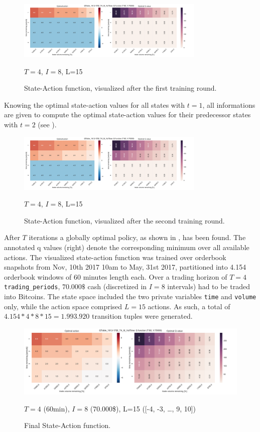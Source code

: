 \begin{figure}[ht]
	\centering
   \includegraphics[width=0.8\textwidth]{content/drawings/heatmap_3months_t1}
	\caption{State-Action function, visualized after the first training round.}
	$T=4$, $I=8$, L=15
	\label{fig:heatmap:t1}
\end{figure}

Knowing the optimal state-action values for all states with $t=1$, all informations are given to compute the optimal state-action values for their predecessor states with $t=2$ (see ).

\begin{figure}[ht]
	\centering
   \includegraphics[width=0.8\textwidth]{content/drawings/heatmap_3months_t2}
	\caption{State-Action function, visualized after the second training round.}
	$T=4$, $I=8$, L=15
	\label{fig:heatmap:t2}
\end{figure}

After $T$ iterations a globally optimal policy, as shown in , has been found. The annotated q values (right) denote the corresponding minimum over all available actions. The visualized state-action function was trained over orderbook snapshots from Nov, 10th 2017 10am to May, 31st 2017, partitioned into 4.154 orderbook windows of 60 minutes length each. Over a trading horizon of $T=4$ \lstinline!trading_periods!, $70.000\$$ cash (discretized in $I=8$ intervals) had to be traded into Bitcoins. The state space included the two private variables \lstinline!time! and \lstinline!volume! only, while the action space comprised $L=15$ actions. As such, a total of $4.154 * 4 * 8 * 15 = 1.993.920$ transition tuples were generated.\\

\begin{figure}[ht]
	\centering
   \includegraphics[width=1.\textwidth]{content/drawings/heatmap_3months}
	\caption{Final State-Action function.}
	$T=4$ (60min), $I=8$ (70.000\$), L=15 ([-4, -3, \ldots{}, 9, 10])
	\label{fig:heatmap}
\end{figure}

